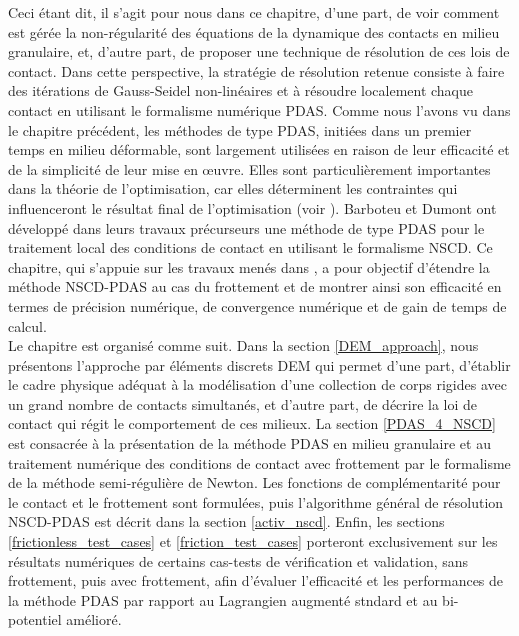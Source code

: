 Ceci étant dit, il s'agit pour nous dans ce chapitre, d'une part, de voir comment est gérée la non-régularité des équations de la dynamique des contacts en milieu granulaire, et, d'autre part, de proposer une technique de résolution de ces lois de contact. Dans cette perspective, la stratégie de résolution retenue consiste à faire des itérations de Gauss-Seidel non-linéaires et à résoudre localement chaque contact en utilisant le formalisme numérique PDAS. Comme nous l'avons vu dans le chapitre précédent, les méthodes de type PDAS, initiées dans un premier temps en milieu déformable, sont largement utilisées en raison de leur efficacité et de la simplicité de leur mise en œuvre. Elles sont particulièrement importantes dans la théorie de l'optimisation, car elles déterminent les contraintes qui influenceront le résultat final de l'optimisation (voir \cite{hintermuller2002primal, hintermuller2003semismooth, hueber2005primal, hueber2008primal}). Barboteu et Dumont ont développé dans leurs travaux précurseurs \cite{barboteu2018primal} une méthode de type PDAS pour le traitement local des conditions de contact en utilisant le formalisme NSCD. Ce chapitre, qui s'appuie sur les travaux menés dans \cite{abide2021semismooth}, a pour objectif d'étendre la méthode NSCD-PDAS au cas du frottement et de montrer ainsi son efficacité en termes de précision numérique, de convergence numérique et de gain de temps de calcul.\\

Le chapitre est organisé comme suit. Dans la section \ref{DEM_approach}, nous présentons l'approche par éléments discrets DEM qui permet d'une part, d'établir le cadre physique adéquat à la modélisation d'une collection de corps rigides avec un grand nombre de contacts simultanés, et d'autre part, de décrire la loi de contact qui régit le comportement de ces milieux. La section \ref{PDAS_4_NSCD} est consacrée à la présentation de la méthode PDAS en milieu granulaire et au traitement numérique des conditions de contact avec frottement par le formalisme de la méthode semi-régulière de Newton. Les fonctions de complémentarité pour le contact et le frottement sont formulées, puis l'algorithme général de résolution NSCD-PDAS est décrit dans la section \ref{activ_nscd}. Enfin, les sections \ref{frictionless_test_cases} et \ref{friction_test_cases} porteront exclusivement sur les résultats numériques de certains cas-tests de vérification et validation, sans frottement, puis avec frottement, afin d'évaluer l'efficacité et les performances de la méthode PDAS par rapport au Lagrangien augmenté stndard et au bi-potentiel amélioré.

